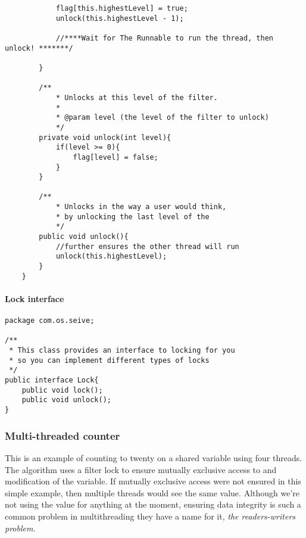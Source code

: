 \documentclass[titlepage]{article}
\begin{document}
\begin{lstlisting}
            flag[this.highestLevel] = true;
            unlock(this.highestLevel - 1);
    
            //****Wait for The Runnable to run the thread, then unlock! *******/
    
        }
    
        /**
            * Unlocks at this level of the filter.
            * 
            * @param level (the level of the filter to unlock)
            */
        private void unlock(int level){
            if(level >= 0){
                flag[level] = false;
            } 
        }
    
        /**
            * Unlocks in the way a user would think,
            * by unlocking the last level of the 
            */
        public void unlock(){
            //further ensures the other thread will run
            unlock(this.highestLevel);
        }
    }
\end{lstlisting}

\paragraph*{Lock interface}

\begin{lstlisting}
package com.os.seive;

/**
 * This class provides an interface to locking for you
 * so you can implement different types of locks
 */
public interface Lock{
    public void lock();
    public void unlock();
}
\end{lstlisting}

\subsubsection{Multi-threaded counter}

This is an example of counting to twenty on a shared variable using four threads. The algorithm uses a filter lock to ensure mutually exclusive access to and modification of the variable. If mutually exclusive access were not ensured in this simple example, then multiple threads would see the same value. Although we're not using the value for anything at the moment, ensuring data integrity is such a common problem in multithreading they have a name for it, \textit{the readers-writers problem}.
\end{document}
